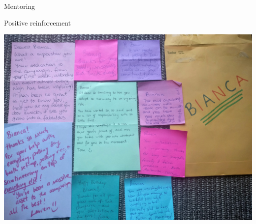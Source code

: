 \documentclass[aspectratio=169]{beamer}
\begin{document}
\begin{frame}
  \begin{center}
    \Huge Mentoring
    \\ \small \cite{hh15}
  \end{center}
\end{frame}

\begin{frame}
  \begin{center}
    \Huge Positive reinforcement
    \\ \small \cite{hh15}
  \end{center}
\end{frame}

\begin{frame}
  \begin{center}
    \includegraphics[scale=.07]{./assets/IMG_20160809_162050.jpg}
  \end{center}
\end{frame}
\end{document}

